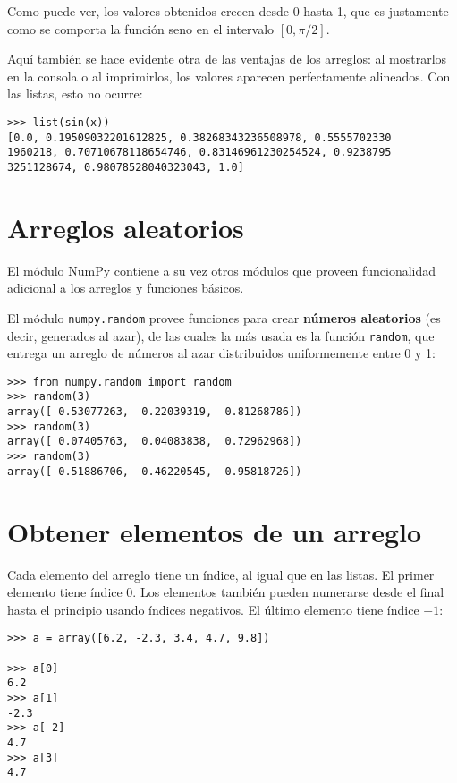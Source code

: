 Como puede ver, los valores obtenidos crecen desde 0 hasta 1, que es
justamente como se comporta la función seno en el intervalo
\(\left[0, \pi/2\right]\).

Aquí también se hace evidente otra de las ventajas de los arreglos: al
mostrarlos en la consola o al imprimirlos, los valores aparecen
perfectamente alineados. Con las listas, esto no ocurre:

\begin{lstlisting}
>>> list(sin(x))
[0.0, 0.19509032201612825, 0.38268343236508978, 0.5555702330
1960218, 0.70710678118654746, 0.83146961230254524, 0.9238795
3251128674, 0.98078528040323043, 1.0]
\end{lstlisting}

\section{Arreglos aleatorios}

El módulo NumPy contiene a su vez otros módulos que proveen
funcio\-na\-lidad adicional a los arreglos y funciones básicos.

El módulo \lstinline!numpy.random! provee funciones para crear
\textbf{números aleatorios} (es decir, generados al azar), de las cuales
la más usada es la función \lstinline!random!, que entrega un arreglo de
números al azar distribuidos uniformemente entre 0 y 1:

\begin{lstlisting}
>>> from numpy.random import random
>>> random(3)
array([ 0.53077263,  0.22039319,  0.81268786])
>>> random(3)
array([ 0.07405763,  0.04083838,  0.72962968])
>>> random(3)
array([ 0.51886706,  0.46220545,  0.95818726])
\end{lstlisting}

\section{Obtener elementos de un arreglo}

Cada elemento del arreglo tiene un índice, al igual que en las listas.
El primer elemento tiene índice 0. Los elementos también pueden
numerarse desde el final hasta el principio usando índices negativos. El
último elemento tiene índice \(-1\):

\begin{lstlisting}
>>> a = array([6.2, -2.3, 3.4, 4.7, 9.8])

>>> a[0]
6.2
>>> a[1]
-2.3
>>> a[-2]
4.7
>>> a[3]
4.7
\end{lstlisting}

